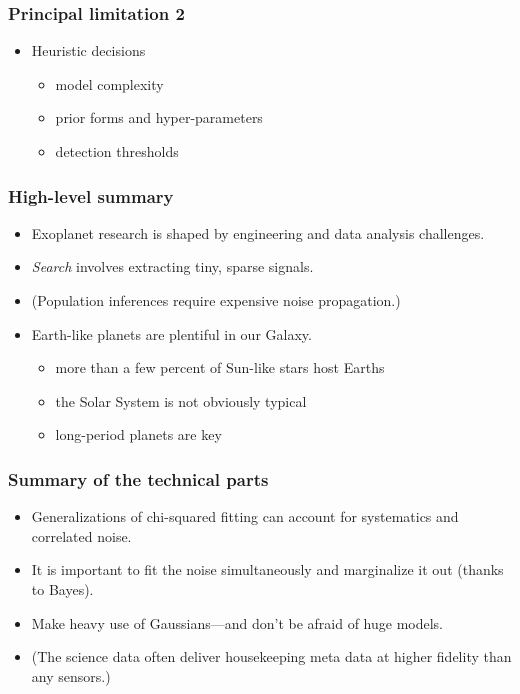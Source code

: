 \documentclass[pdftex]{beamer}
\newcommand{\conclusions}{%
\begin{frame}
  \frametitle{High-level summary}
  \begin{itemize}
  \item Exoplanet research is shaped by engineering and data analysis challenges.
  \item \emph{Search} involves extracting tiny, sparse signals.
  \item (Population inferences require expensive noise propagation.)
  \item Earth-like planets are plentiful in our Galaxy.
    \begin{itemize}
    \item more than a few percent of Sun-like stars host Earths
    \item the Solar System is not obviously typical
    \item long-period planets are key
    \end{itemize}
  \end{itemize}
\end{frame}

\begin{frame}
  \frametitle{Summary of the technical parts}
  \begin{itemize}
  \item Generalizations of chi-squared fitting can account for
    systematics and correlated noise.
  \item It is important to fit the noise simultaneously and
    marginalize it out (thanks to Bayes).
  \item Make heavy use of Gaussians---and don't be afraid of huge models.
  \item (The science data often deliver housekeeping meta data at
    higher fidelity than any sensors.)
  \end{itemize}
\end{frame}}
\begin{document}
\begin{frame}
  \frametitle{Principal limitation 2}
  \begin{itemize}
  \item Heuristic decisions
    \begin{itemize}
    \item model complexity
    \item prior forms and hyper-parameters
    \item detection thresholds
    \end{itemize}
  \end{itemize}
\end{frame}

\conclusions
\end{document}
